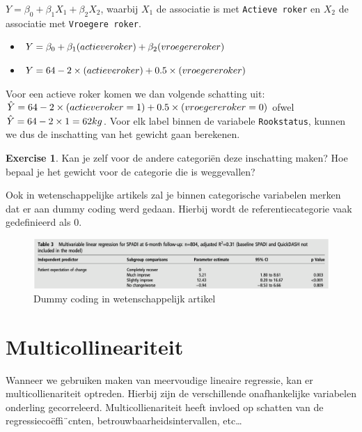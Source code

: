 \documentclass[
]{book}
\providecommand{\tightlist}{%
  \setlength{\itemsep}{0pt}\setlength{\parskip}{0pt}}
\theoremstyle{definition}
\theoremstyle{definition}
\theoremstyle{definition}
\newtheorem{exercise}{Exercise}[chapter]
\theoremstyle{definition}
\theoremstyle{remark}
\begin{document}
\(Y = \beta_0 + \beta_1 X_1 + \beta_2 X_2\), waarbij \(X_1\) de associatie is met \texttt{Actieve\ roker} en \(X_2\) de associatie met \texttt{Vroegere\ roker}.

\begin{itemize}
\tightlist
\item
  \(Y = \beta_0 + \beta_1 (actieve \space roker) + \beta_2 (vroegere \space roker)\)
\item
  \(Y = 64 - 2 \times (actieve \space roker) + 0.5 \times (vroegere \space roker)\)
\end{itemize}

Voor een actieve roker komen we dan volgende schatting uit: \(\hat{Y} = 64 - 2 \times (actieve \space roker = 1) + 0.5 \times (vroegere \space roker = 0)\) ofwel \(\hat{Y} = 64 - 2 \times 1 = 62 \space kg\). Voor elk label binnen de variabele \texttt{Rookstatus}, kunnen we dus de inschatting van het gewicht gaan berekenen.

\begin{exercise}
Kan je zelf voor de andere categoriën deze inschatting maken? Hoe bepaal je het gewicht voor de categorie die is weggevallen?
\end{exercise}

Ook in wetenschappelijke artikels zal je binnen categorische variabelen merken dat er aan dummy coding werd gedaan. Hierbij wordt de referentiecategorie vaak gedefinieerd als \(0\).

\begin{figure}
\includegraphics[width=1\linewidth]{img/chester_dummy} \caption{Dummy coding in wetenschappelijk artikel}\label{fig:chesterdummy}
\end{figure}

\hypertarget{multicollineariteit}{%
\section*{Multicollineariteit}\label{multicollineariteit}}


Wanneer we gebruiken maken van meervoudige lineaire regressie, kan er multicollienariteit optreden. Hierbij zijn de verschillende onafhankelijke variabelen onderling gecorreleerd. Multicollienariteit heeft invloed op schatten van de regressiecoëffi¨cnten, betrouwbaarheidsintervallen, etc\ldots{}
\end{document}

